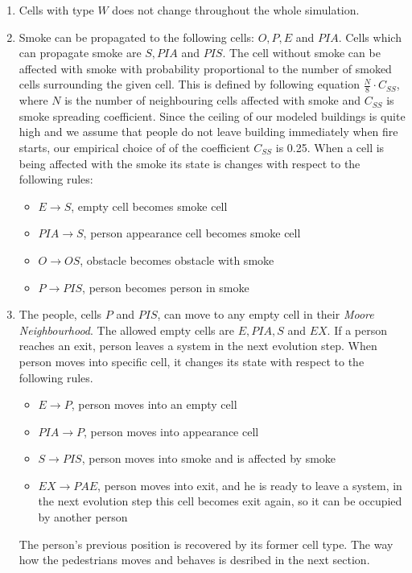 \begin{enumerate}
    \item Cells with type $W$ does not change throughout the whole simulation.
    \item Smoke can be propagated to the following cells: $O, P, E$ and $PIA$.
    Cells which can propagate smoke are $S,PIA$ and $PIS$. The cell without
    smoke can be affected with smoke with probability proportional to the
    number of smoked cells surrounding the given cell. This is defined by
    following equation $\frac{N}{8} \cdot C_{SS}$, where $N$ is the number of
    neighbouring cells affected with smoke and $C_{SS}$ is smoke spreading
    coefficient. Since the ceiling of our modeled buildings is quite high and
    we assume that people do not leave building immediately when fire
    starts, our empirical choice of of the coefficient $C_{SS}$ is 0.25.
    When a cell is being affected with the smoke its state is changes with
    respect to the following rules:
    \begin{itemize}
        \item $E \rightarrow S$, empty cell becomes smoke cell
        \item $PIA \rightarrow S$, person appearance cell becomes smoke cell
        \item $O \rightarrow OS$, obstacle becomes obstacle with smoke
        \item $P \rightarrow PIS$, person becomes person in smoke
    \end{itemize}
    \item The people, cells $P$ and $PIS$, can move to any empty cell in their
    \emph{Moore Neighbourhood}. The allowed empty cells are $E,PIA,S$ and $EX$.
    If a person reaches an exit, person leaves a system in the next evolution
    step. When person moves into specific cell, it changes its state with
    respect to the following rules.
    \begin{itemize}
        \item $E \rightarrow P$, person moves into an empty cell
        \item $PIA \rightarrow P$, person moves into appearance cell
        \item $S \rightarrow PIS$, person moves into smoke and is affected by
        smoke
        \item $EX \rightarrow PAE$, person moves into exit, and he is ready to
        leave a system, in the next evolution step this cell becomes exit
        again, so it can be occupied by another person
    \end{itemize}
    The person's previous position is recovered by its former cell type. The
    way how the pedestrians moves and behaves is desribed in the next section.
\end{enumerate}

